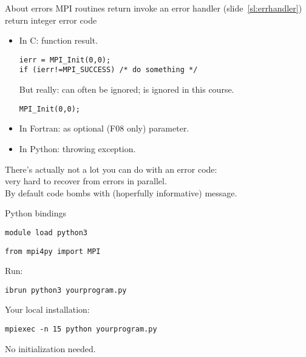 \begin{numberedframe}{About errors}
  MPI routines return invoke an error handler (slide~\ref{sl:errhandler})\\
  return integer error code
  \begin{itemize}
  \item In C: function result. 
\lstset{language=C++}
\begin{lstlisting}
ierr = MPI_Init(0,0);
if (ierr!=MPI_SUCCESS) /* do something */
\end{lstlisting}
  But really: can often be ignored; is ignored in this course.
\begin{lstlisting}
MPI_Init(0,0);
\end{lstlisting}
  \item In Fortran: as optional (F08 only) parameter.
  \item In Python: throwing exception.
  \end{itemize}
  There's actually not a lot you can do with an error code:\\
  very hard to recover from errors in parallel.\\
  By default code bombs with (hoperfully informative) message.
\end{numberedframe}

\begin{python}
\begin{numberedframe}{Python bindings}
\begin{verbatim}
module load python3
\end{verbatim}
\begin{verbatim}
from mpi4py import MPI
\end{verbatim}
Run:
\begin{tacc}
\begin{verbatim}
ibrun python3 yourprogram.py
\end{verbatim}
\end{tacc}
Your local installation:
\begin{verbatim}
mpiexec -n 15 python yourprogram.py
\end{verbatim}
No initialization needed.
\end{numberedframe}
\end{python}

